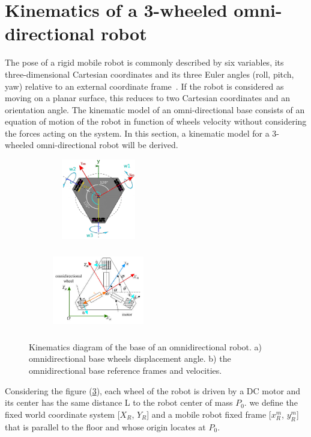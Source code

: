 \section{Kinematics of a 3-wheeled omni-directional robot}\label{sec:kinematics}
The pose of a rigid mobile robot is commonly described by six variables, its three-dimensional Cartesian coordinates and its three Euler angles (roll, pitch, yaw) relative to an external coordinate frame~\citep{thrun_probabilistic_2005}. If the robot is considered as moving on a planar surface, this reduces to two Cartesian coordinates and an orientation angle.
The kinematic model of an omni-directional base consists of an equation of motion of the robot in function of wheels velocity without considering the forces acting on the system. In this section, a kinematic model for a 3-wheeled omni-directional robot will be derived.

\begin{figure}[H]
  \centering
  \begin{subfigure}[b]{0.4\textwidth}
     \centering
      \includegraphics[width=4cm, height=3.5cm]{images/03-foundation/triskarbase1}
	\caption{}
	\label{triskar1} 
  \end{subfigure}
  \begin{subfigure}[b]{0.4\textwidth}
  \centering
      \includegraphics[width=4cm, height=3.5cm]{images/03-foundation/triskarbase2}
	\caption{}
	\label{triskar2} 
  \end{subfigure}
  \caption{Kinematics diagram of the base of an omnidirectional robot. a) omnidirectional base wheels displacement angle. b) the omnidirectional base reference frames and velocities.}
\end{figure}

Considering the figure (\ref{triskar2}), each wheel of the robot is driven by a DC motor and its center has the same distance L to the robot center of mass $P_0$. we define the fixed world coordinate system [$X_R$, $Y_R$] and a mobile robot fixed frame [${x}^m_R$, ${y}^m_R$] that is parallel to the floor and whose origin locates at $P_0$.

